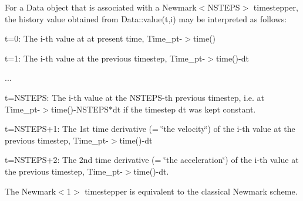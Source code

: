 For a {\ttfamily Data} object that is associated with a {\ttfamily Newmark$<$\+N\+S\+T\+E\+P\+S$>$} timestepper, the history value obtained from {\ttfamily Data\+::value(t,i)} may be interpreted as follows\+:
\begin{DoxyItemize}
\item t=0\+: The i-\/th value at at present time, {\ttfamily Time\+\_\+pt-\/$>$time()} 
\item t=1\+: The i-\/th value at the previous timestep, {\ttfamily Time\+\_\+pt-\/$>$time()-\/dt} 
\item ...
\item t=N\+S\+T\+E\+PS\+: The i-\/th value at the N\+S\+T\+E\+P\+S-\/th previous timestep, i.\+e. at {\ttfamily Time\+\_\+pt-\/$>$time()-\/\+N\+S\+T\+E\+P\+S$\ast$dt} if the timestep dt was kept constant.
\item t=N\+S\+T\+E\+P\+S+1\+: The 1st time derivative (= \char`\"{}the velocity\char`\"{}) of the i-\/th value at the previous timestep, {\ttfamily Time\+\_\+pt-\/$>$time()-\/dt} 
\item t=N\+S\+T\+E\+P\+S+2\+: The 2nd time derivative (= \char`\"{}the acceleration\char`\"{}) of the i-\/th value at the previous timestep, {\ttfamily Time\+\_\+pt-\/$>$time()-\/dt}.
\end{DoxyItemize}The {\ttfamily Newmark$<$1$>$} timestepper is equivalent to the classical Newmark scheme.



